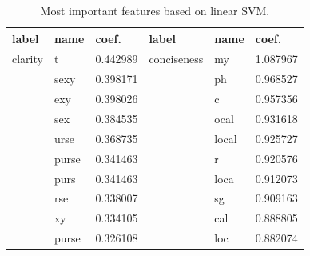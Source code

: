 \documentclass[sigconf]{acmart}
\begin{document}

\begin{table}[]
\small
\centering
\caption{Most important features based on linear SVM.}
\label{tbl:top_features}
\begin{tabular}{lll|lll}
\hline
\textbf{label} &\textbf{name} & \textbf{coef.} & \textbf{label} &\textbf{name} & \textbf{coef.} \\ \hline
clarity
&t     &0.442989 & conciseness & my     &   1.087967\\
&sexy  &   0.398171 & & ph     &   0.968527\\
&exy   &  0.398026 & & c      &  0.957356\\
&sex   &  0.384535 & & ocal   &     0.931618\\
&urse  &   0.368735 & & local  &      0.925727\\
&purse &    0.341463 & & r      &  0.920576\\
&purs  &   0.341463 & & loca   &     0.912073\\
&rse   &  0.338007 & & sg     &   0.909163\\
&xy    & 0.334105 & & cal    &    0.888805\\
&purse &    0.326108 & & loc    &    0.882074\\

\hline
\end{tabular}
\end{table}
\end{document}
